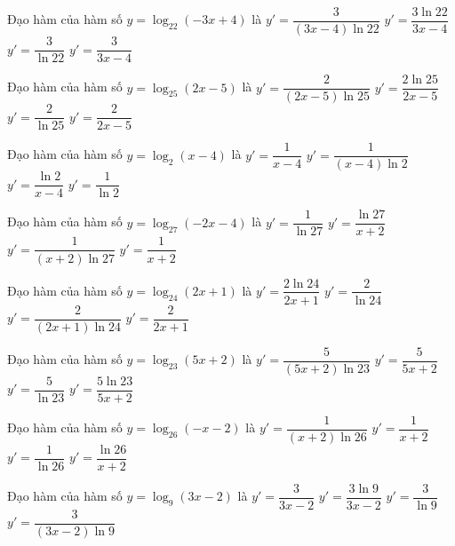 \documentclass[12pt,a4paper]{article}
\begin{document}
\begin{ex}
Đạo hàm của hàm số $y=\log_{22}(-3x+4)$ là
\choice
{\True $y'=\dfrac{3}{(3x-4)\ln 22}$}
{$y'=\dfrac{3\ln{22}}{3x-4}$}
{$y'=\dfrac{3}{\ln{22}}$}
{$y'=\dfrac{3}{3x-4}$}
\end{ex}
\begin{ex}
Đạo hàm của hàm số $y=\log_{25}(2x-5)$ là
\choice
{\True $y'=\dfrac{2}{(2x-5)\ln 25}$}
{$y'=\dfrac{2\ln{25}}{2x-5}$}
{$y'=\dfrac{2}{\ln{25}}$}
{$y'=\dfrac{2}{2x-5}$}
\end{ex}
\begin{ex}
Đạo hàm của hàm số $y=\log_2(x-4)$ là
\choice
{$y'=\dfrac{1}{x-4}$}
{\True $y'=\dfrac{1}{(x-4)\ln 2}$}
{$y'=\dfrac{\ln{2}}{x-4}$}
{$y'=\dfrac{1}{\ln{2}}$}
\end{ex}
\begin{ex}
Đạo hàm của hàm số $y=\log_{27}(-2x-4)$ là
\choice
{$y'=\dfrac{1}{\ln{27}}$}
{$y'=\dfrac{\ln{27}}{x+2}$}
{\True $y'=\dfrac{1}{(x+2)\ln 27}$}
{$y'=\dfrac{1}{x+2}$}
\end{ex}
\begin{ex}
Đạo hàm của hàm số $y=\log_{24}(2x+1)$ là
\choice
{$y'=\dfrac{2\ln{24}}{2x+1}$}
{$y'=\dfrac{2}{\ln{24}}$}
{\True $y'=\dfrac{2}{(2x+1)\ln 24}$}
{$y'=\dfrac{2}{2x+1}$}
\end{ex}
\begin{ex}
Đạo hàm của hàm số $y=\log_{23}(5x+2)$ là
\choice
{\True $y'=\dfrac{5}{(5x+2)\ln 23}$}
{$y'=\dfrac{5}{5x+2}$}
{$y'=\dfrac{5}{\ln{23}}$}
{$y'=\dfrac{5\ln{23}}{5x+2}$}
\end{ex}
\begin{ex}
Đạo hàm của hàm số $y=\log_{26}(-x-2)$ là
\choice
{\True $y'=\dfrac{1}{(x+2)\ln 26}$}
{$y'=\dfrac{1}{x+2}$}
{$y'=\dfrac{1}{\ln{26}}$}
{$y'=\dfrac{\ln{26}}{x+2}$}
\end{ex}
\begin{ex}
Đạo hàm của hàm số $y=\log_9(3x-2)$ là
\choice
{$y'=\dfrac{3}{3x-2}$}
{$y'=\dfrac{3\ln{9}}{3x-2}$}
{$y'=\dfrac{3}{\ln{9}}$}
{\True $y'=\dfrac{3}{(3x-2)\ln 9}$}
\end{ex}
\end{document}
